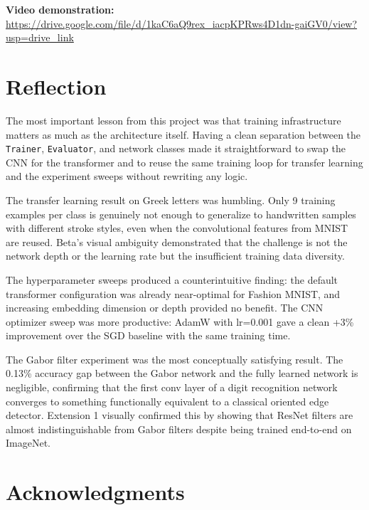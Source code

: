 \documentclass[11pt]{article}
\begin{document}
\textbf{Video demonstration:} \\
\url{https://drive.google.com/file/d/1kaC6aQ9rex_iacpKPRws4D1dn-gaiGV0/view?usp=drive_link}

\newpage

\section{Reflection}

The most important lesson from this project was that training infrastructure matters as much as the architecture itself. Having a clean separation between the \texttt{Trainer}, \texttt{Evaluator}, and network classes made it straightforward to swap the CNN for the transformer and to reuse the same training loop for transfer learning and the experiment sweeps without rewriting any logic.

The transfer learning result on Greek letters was humbling. Only 9 training examples per class is genuinely not enough to generalize to handwritten samples with different stroke styles, even when the convolutional features from MNIST are reused. Beta's visual ambiguity demonstrated that the challenge is not the network depth or the learning rate but the insufficient training data diversity.

The hyperparameter sweeps produced a counterintuitive finding: the default transformer configuration was already near-optimal for Fashion MNIST, and increasing embedding dimension or depth provided no benefit. The CNN optimizer sweep was more productive: AdamW with lr=0.001 gave a clean +3\% improvement over the SGD baseline with the same training time.

The Gabor filter experiment was the most conceptually satisfying result. The 0.13\% accuracy gap between the Gabor network and the fully learned network is negligible, confirming that the first conv layer of a digit recognition network converges to something functionally equivalent to a classical oriented edge detector. Extension 1 visually confirmed this by showing that ResNet filters are almost indistinguishable from Gabor filters despite being trained end-to-end on ImageNet.

\section{Acknowledgments}
\end{document}
